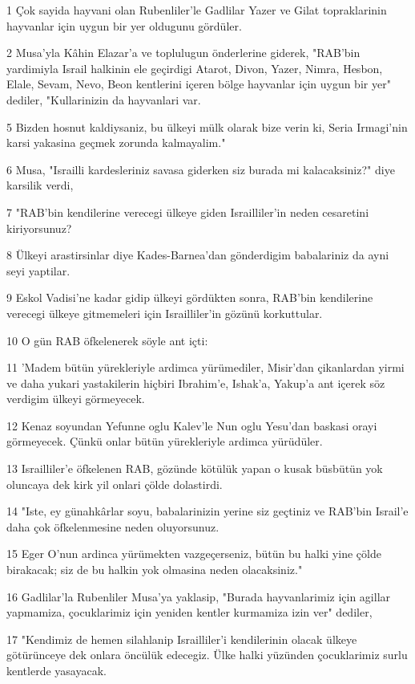 \par 1 Çok sayida hayvani olan Rubenliler'le Gadlilar Yazer ve Gilat topraklarinin hayvanlar için uygun bir yer oldugunu gördüler.
\par 2 Musa'yla Kâhin Elazar'a ve toplulugun önderlerine giderek, "RAB'bin yardimiyla Israil halkinin ele geçirdigi Atarot, Divon, Yazer, Nimra, Hesbon, Elale, Sevam, Nevo, Beon kentlerini içeren bölge hayvanlar için uygun bir yer" dediler, "Kullarinizin da hayvanlari var.
\par 5 Bizden hosnut kaldiysaniz, bu ülkeyi mülk olarak bize verin ki, Seria Irmagi'nin karsi yakasina geçmek zorunda kalmayalim."
\par 6 Musa, "Israilli kardesleriniz savasa giderken siz burada mi kalacaksiniz?" diye karsilik verdi,
\par 7 "RAB'bin kendilerine verecegi ülkeye giden Israilliler'in neden cesaretini kiriyorsunuz?
\par 8 Ülkeyi arastirsinlar diye Kades-Barnea'dan gönderdigim babalariniz da ayni seyi yaptilar.
\par 9 Eskol Vadisi'ne kadar gidip ülkeyi gördükten sonra, RAB'bin kendilerine verecegi ülkeye gitmemeleri için Israilliler'in gözünü korkuttular.
\par 10 O gün RAB öfkelenerek söyle ant içti:
\par 11 'Madem bütün yürekleriyle ardimca yürümediler, Misir'dan çikanlardan yirmi ve daha yukari yastakilerin hiçbiri Ibrahim'e, Ishak'a, Yakup'a ant içerek söz verdigim ülkeyi görmeyecek.
\par 12 Kenaz soyundan Yefunne oglu Kalev'le Nun oglu Yesu'dan baskasi orayi görmeyecek. Çünkü onlar bütün yürekleriyle ardimca yürüdüler.
\par 13 Israilliler'e öfkelenen RAB, gözünde kötülük yapan o kusak büsbütün yok oluncaya dek kirk yil onlari çölde dolastirdi.
\par 14 "Iste, ey günahkârlar soyu, babalarinizin yerine siz geçtiniz ve RAB'bin Israil'e daha çok öfkelenmesine neden oluyorsunuz.
\par 15 Eger O'nun ardinca yürümekten vazgeçerseniz, bütün bu halki yine çölde birakacak; siz de bu halkin yok olmasina neden olacaksiniz."
\par 16 Gadlilar'la Rubenliler Musa'ya yaklasip, "Burada hayvanlarimiz için agillar yapmamiza, çocuklarimiz için yeniden kentler kurmamiza izin ver" dediler,
\par 17 "Kendimiz de hemen silahlanip Israilliler'i kendilerinin olacak ülkeye götürünceye dek onlara öncülük edecegiz. Ülke halki yüzünden çocuklarimiz surlu kentlerde yasayacak.
